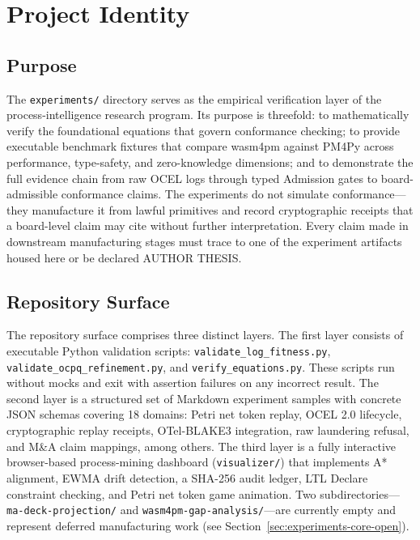 
\section{Project Identity}
\label{sec:experiments-core-identity}

\subsection{Purpose}
\label{sec:experiments-core-identity-purpose}

The \texttt{experiments/} directory serves as the empirical verification layer of the
process-intelligence research program. Its purpose is threefold: to mathematically verify
the foundational equations that govern conformance checking; to provide executable benchmark
fixtures that compare wasm4pm against PM4Py across performance, type-safety, and
zero-knowledge dimensions; and to demonstrate the full evidence chain from raw OCEL logs
through typed Admission gates to board-admissible conformance claims. The experiments do
not simulate conformance---they manufacture it from lawful primitives and record cryptographic
receipts that a board-level claim may cite without further interpretation. Every claim made
in downstream manufacturing stages must trace to one of the experiment artifacts housed
here or be declared AUTHOR THESIS.

\subsection{Repository Surface}
\label{sec:experiments-core-identity-surface}

The repository surface comprises three distinct layers. The first layer consists of
executable Python validation scripts: \texttt{validate\_log\_fitness.py},
\texttt{validate\_ocpq\_refinement.py}, and \texttt{verify\_equations.py}. These scripts
run without mocks and exit with assertion failures on any incorrect result. The second
layer is a structured set of Markdown experiment samples with concrete JSON schemas covering
18 domains: Petri net token replay, OCEL 2.0 lifecycle, cryptographic replay receipts,
OTel-BLAKE3 integration, raw laundering refusal, and M\&A claim mappings, among others.
The third layer is a fully interactive browser-based process-mining dashboard
(\texttt{visualizer/}) that implements A* alignment, EWMA drift detection, a SHA-256
audit ledger, LTL Declare constraint checking, and Petri net token game animation. Two
subdirectories---\texttt{ma-deck-projection/} and \texttt{wasm4pm-gap-analysis/}---are
currently empty and represent deferred manufacturing work (see Section~\ref{sec:experiments-core-open}).

